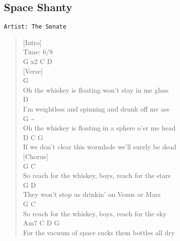 \documentclass[11pt]{article}
\begin{document}
\subsection{Space Shanty}
\label{sec:orgd4df882}
\begin{verbatim}
Artist: The Senate
\end{verbatim}
\begin{verse}
[Intro]\\
Time: 6/8\\
\hspace*{1em}G x2 C  D\\
\vspace*{1em}
[Verse]\\
\hspace*{8em}G\\
Oh the whiskey is floating won't stay in me glass\\
\hspace*{5em}D\\
I'm weightless and spinning and drunk off me ass\\
\hspace*{8em}G                          \textasciitilde{}\\
Oh the whiskey is floating in a sphere o'er me head\\
\hspace*{7em}D                                 C        G\\
If we don't clear this wormhole we'll surely be dead\\
\vspace*{1em}
[Chorus]\\
\hspace*{5em}G                                        C\\
So reach for the whiskey, boys, reach for the stars\\
\hspace*{6em}G                          D\\
They won't stop us drinkin' on Venus or Mars\\
\hspace*{5em}G                                          C\\
So reach for the whiskey, boys, reach for the sky\\
\hspace*{9em}Am7         C               D           G\\
For the vacuum of space sucks them bottles all dry\\
\vspace*{1em}

\end{verse}
\end{document}
